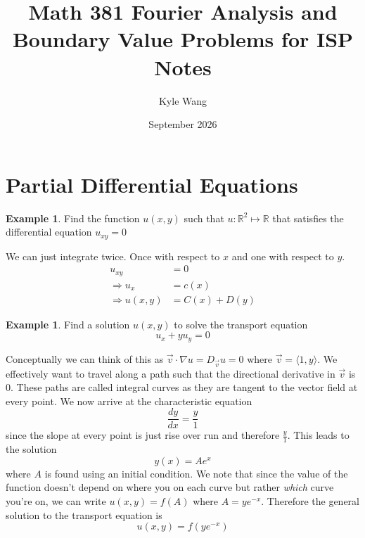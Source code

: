 \documentclass{article}
\title{Math 381 Fourier Analysis and Boundary Value Problems for ISP Notes}
\author{Kyle Wang}
\date{September 2026}
\newcommand{\R}{\mathbb{R}}
\newcommand{\od}[2]{\frac{d #1}{d #2}}
\theoremstyle{definition}
\newtheorem{example}[theorem]{Example}
\begin{document}
\maketitle
\tableofcontents
\section{Partial Differential Equations}
\begin{example}
    Find the function $u(x,y)$ such that $u: \R^2 \mapsto \R $ that satisfies the differential equation $u_{xy}=0$
\end{example}
We can just integrate twice. Once with respect to $x$ and one with respect to $y$. 
\begin{equation*}
    \begin{split}
        u_{xy} &= 0 \\
        \Rightarrow u_x&=c(x) \\
        \Rightarrow u(x,y) &=C(x) + D(y)
    \end{split}
\end{equation*}

\begin{example}
    Find a solution $u(x,y)$ to solve the transport equation 
    \begin{equation*}
        u_x+yu_y=0
    \end{equation*}
\end{example}
Conceptually we can think of this as $\vec{v}\cdot \nabla u = D_{\vec{v}}u=0$ where $\vec{v} = \langle 1,y\rangle$. We effectively want to travel along a path such that the directional derivative in $\vec{v}$ is 0. These paths are called integral curves as they are tangent to the vector field at every point. We now arrive at the characteristic equation 
\begin{equation*}
    \od{y}{x}=\frac{y}{1}
\end{equation*}
since the slope at every point is just rise over run and therefore $\frac{y}{1}$. This leads to the solution 
\begin{equation*}
    y(x) = Ae^{x}
\end{equation*}
where $A$ is found using an initial condition. We note that since the value of the function doesn't depend on where you on each curve but rather \emph{which} curve you're on, we can write $u(x,y) =f(A)$ where $A=ye^{-x}$. Therefore the general solution to the transport equation is 
\begin{equation*}
    u(x,y) = f(ye^{-x})
\end{equation*}
\end{document}
